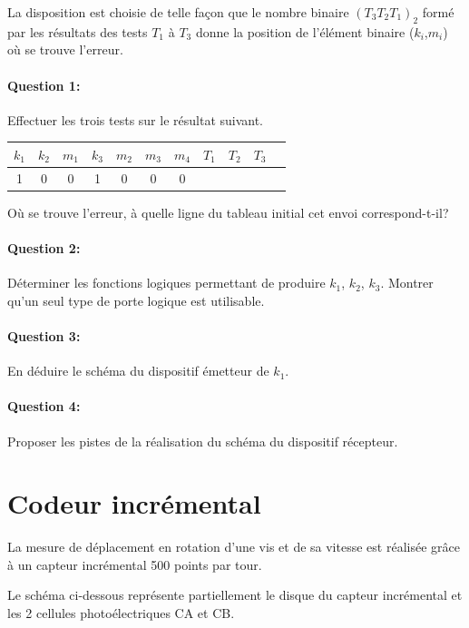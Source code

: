 La disposition est choisie de telle façon que le nombre binaire $(T_3T_2T_1)_2$ formé par les résultats des tests $T_1$ à $T_3$ donne la position de l'élément binaire ($k_i$,$m_i$) où se trouve l'erreur.

\paragraph{Question 1:} Effectuer les trois tests sur le résultat suivant.

\begin{center}
\begin{tabular}{|c|c|c|c|c|c|c|c|c|c|c|}
\hline
$k_1$ & $k_2$ & $m_1$ & $k_3$ & $m_2$ & $m_3$ & $m_4$ & $T_1$ & $T_2$ & $T_3$\\
\hline
1 & 0 & 0 & 1 & 0 & 0 & 0 & & & \\
\hline
\end{tabular} 
\end{center}

Où se trouve l'erreur, à quelle ligne du tableau initial cet envoi correspond-t-il?

\paragraph{Question 2:} Déterminer les fonctions logiques permettant de produire $k_1$, $k_2$, $k_3$. Montrer qu'un seul type de porte logique est utilisable.

\paragraph{Question 3:} En déduire le schéma du dispositif émetteur de $k_1$.

\paragraph{Question 4:} Proposer les pistes de la réalisation du schéma du dispositif récepteur.

\section{Codeur incrémental}

La mesure de déplacement en rotation d'une vis et de sa vitesse est réalisée grâce à un capteur incrémental 500 points par tour.

Le schéma ci-dessous représente partiellement le disque du capteur incrémental et les 2 cellules photoélectriques CA et CB.

